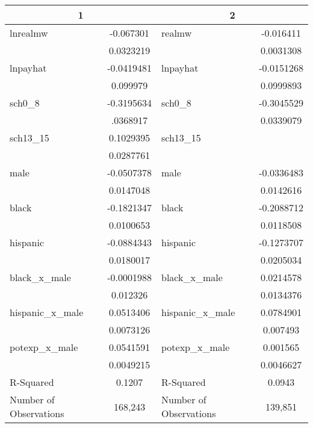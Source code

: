 \documentclass{article}
\begin{document}
\begin{table}[ht]
\centering
\caption{}
\label{my-label}
\begin{tabular}{lclc}
\hline
\multicolumn{2}{c}{1}               & \multicolumn{2}{c}{2}               \\
\hline
lnrealmw               & -0.067301  & realmw                 & -0.016411  \\
                       & 0.0323219  &                        & 0.0031308  \\
lnpayhat               & -0.0419481 & lnpayhat               & -0.0151268 \\
                       & 0.099979   &                        & 0.0999893  \\
sch0\_8                & -0.3195634 & sch0\_8                & -0.3045529 \\
                       & .0368917   &                        & 0.0339079  \\
sch13\_15              & 0.1029395  & sch13\_15              &            \\
                       & 0.0287761  &                        &            \\
male                   & -0.0507378 & male                   & -0.0336483 \\
                       & 0.0147048  &                        & 0.0142616  \\
black                  & -0.1821347 & black                  & -0.2088712 \\
                       & 0.0100653  &                        & 0.0118508  \\
hispanic               & -0.0884343 & hispanic               & -0.1273707 \\
                       & 0.0180017  &                        & 0.0205034  \\
black\_x\_male         & -0.0001988 & black\_x\_male         & 0.0214578  \\
                       & 0.012326   &                        & 0.0134376  \\
hispanic\_x\_male      & 0.0513406  & hispanic\_x\_male      & 0.0784901  \\
                       & 0.0073126  &                        & 0.007493   \\
potexp\_x\_male        & 0.0541591  & potexp\_x\_male        & 0.001565   \\
                       & 0.0049215  &                        & 0.0046627  \\
R-Squared              & 0.1207     & R-Squared              & 0.0943     \\
Number of Observations & 168,243    & Number of Observations & 139,851 \\
\hline
\end{tabular}
\end{table}
\end{document}
